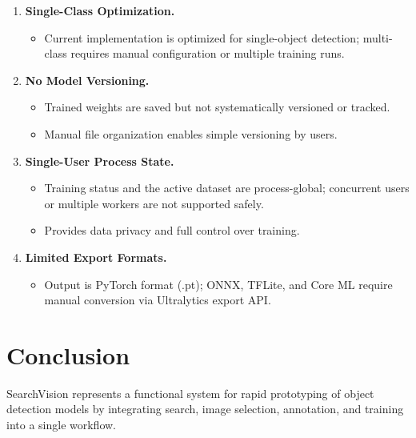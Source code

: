 \documentclass[12pt, letterpaper]{article}
\begin{document}
\begin{enumerate}
  \item \textbf{Single-Class Optimization.} 
    \begin{itemize}
      \item Current implementation is optimized for single-object detection; 
        multi-class requires manual configuration or multiple training runs.
    \end{itemize}
  
  \item \textbf{No Model Versioning.} 
    \begin{itemize}
      \item Trained weights are saved but not systematically versioned or tracked.
      \item Manual file organization enables simple versioning by users.
    \end{itemize}
  
  \item \textbf{Single-User Process State.}
    \begin{itemize}
      \item Training status and the active dataset are process-global; concurrent users
        or multiple workers are not supported safely.
      \item Provides data privacy and full control over training.
    \end{itemize}
  
  \item \textbf{Limited Export Formats.} 
    \begin{itemize}
      \item Output is PyTorch format (.pt); ONNX, TFLite, and Core ML require manual conversion
        via Ultralytics export API.
    \end{itemize}
\end{enumerate}

\section{Conclusion}

SearchVision represents a functional system for rapid prototyping of object detection models 
by integrating search, image selection, annotation, and training into a single workflow.
\end{document}
